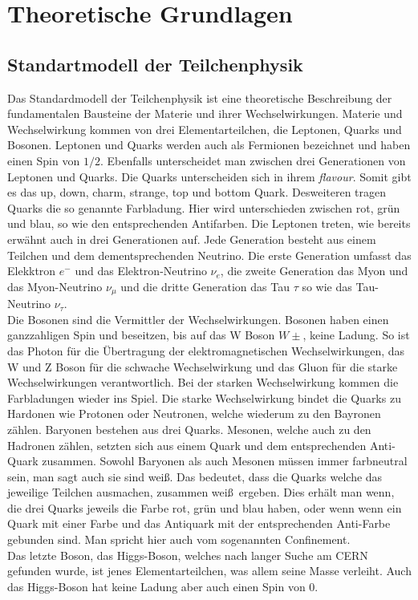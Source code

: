 \section{Theoretische Grundlagen} \label{grundlagen}

\subsection{Standartmodell der Teilchenphysik} \label{standartmodell}
Das Standardmodell der Teilchenphysik ist eine theoretische Beschreibung der fundamentalen Bausteine der Materie und ihrer Wechselwirkungen.
Materie und Wechselwirkung kommen von drei Elementarteilchen, die Leptonen, Quarks und Bosonen. 
Leptonen und Quarks werden auch als Fermionen bezeichnet und haben einen Spin von $1/2$. 
Ebenfalls unterscheidet man zwischen drei Generationen von Leptonen und Quarks. 
Die Quarks unterscheiden sich in ihrem \textit{flavour}. 
Somit gibt es das up, down, charm, strange, top und bottom Quark. 
Desweiteren tragen Quarks die so genannte Farbladung.
Hier wird unterschieden zwischen rot, grün und blau, so wie den entsprechenden Antifarben. 
Die Leptonen treten, wie bereits erwähnt auch in drei Generationen auf. 
Jede Generation besteht aus einem Teilchen und dem dementsprechenden Neutrino. 
Die erste Generation umfasst das Elekktron $e^{-}$ und das Elektron-Neutrino $\nu_e$, die zweite Generation das Myon und das Myon-Neutrino $\nu_{\mu}$ und die dritte Generation das Tau $\tau$ so wie das Tau-Neutrino $\nu_{\tau}$.\\
\newline 
Die Bosonen sind die Vermittler der Wechselwirkungen. 
Bosonen haben einen ganzzahligen Spin und beseitzen, bis auf das W Boson $W\pm$, keine Ladung. 
So ist das Photon für die Übertragung der elektromagnetischen Wechselwirkungen, das W und Z Boson für die schwache Wechselwirkung und das Gluon für die starke Wechselwirkungen verantwortlich. 
Bei der starken Wechselwirkung kommen die Farbladungen wieder ins Spiel. 
Die starke Wechselwirkung bindet die Quarks zu Hardonen wie Protonen oder Neutronen, welche wiederum zu den Bayronen zählen.
Baryonen bestehen aus drei Quarks. 
Mesonen, welche auch zu den Hadronen zählen, setzten sich aus einem Quark und dem entsprechenden Anti-Quark zusammen. 
Sowohl Baryonen als auch Mesonen müssen immer farbneutral sein, man sagt auch sie sind \glqq weiß\grqq . 
Das bedeutet, dass die Quarks welche das jeweilige Teilchen ausmachen, zusammen \glqq weiß\grqq \ ergeben. 
Dies erhält man wenn, die drei Quarks jeweils die Farbe rot, grün und blau haben, oder wenn wenn ein Quark mit einer Farbe und das Antiquark mit der entsprechenden Anti-Farbe gebunden sind.
Man spricht hier auch vom sogenannten Confinement. \\
Das letzte Boson, das Higgs-Boson, welches nach langer Suche am CERN gefunden wurde, ist jenes Elementarteilchen, was allem seine Masse verleiht. Auch das Higgs-Boson hat keine Ladung aber auch einen Spin von 0.

